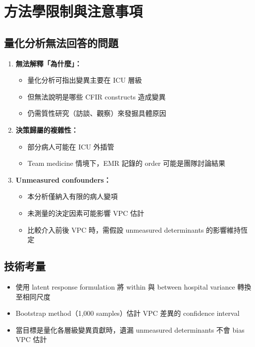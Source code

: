 \documentclass[12pt,a4paper]{article}
\begin{document}
\section{方法學限制與注意事項}

\subsection{量化分析無法回答的問題}

\begin{enumerate}
    \item \textbf{無法解釋「為什麼」：}
    \begin{itemize}
        \item 量化分析可指出變異主要在 ICU 層級
        \item 但無法說明是哪些 CFIR constructs 造成變異
        \item 仍需質性研究（訪談、觀察）來發掘具體原因
    \end{itemize}

    \item \textbf{決策歸屬的複雜性：}
    \begin{itemize}
        \item 部分病人可能在 ICU 外插管
        \item Team medicine 情境下，EMR 記錄的 order 可能是團隊討論結果
    \end{itemize}

    \item \textbf{Unmeasured confounders：}
    \begin{itemize}
        \item 本分析僅納入有限的病人變項
        \item 未測量的決定因素可能影響 VPC 估計
        \item 比較介入前後 VPC 時，需假設 unmeasured determinants 的影響維持恆定
    \end{itemize}
\end{enumerate}

\subsection{技術考量}

\begin{itemize}
    \item 使用 latent response formulation 將 within 與 between hospital variance 轉換至相同尺度
    \item Bootstrap method（1,000 samples）估計 VPC 差異的 confidence interval
    \item 當目標是量化各層級變異貢獻時，遺漏 unmeasured determinants 不會 bias VPC 估計
\end{itemize}
\end{document}
